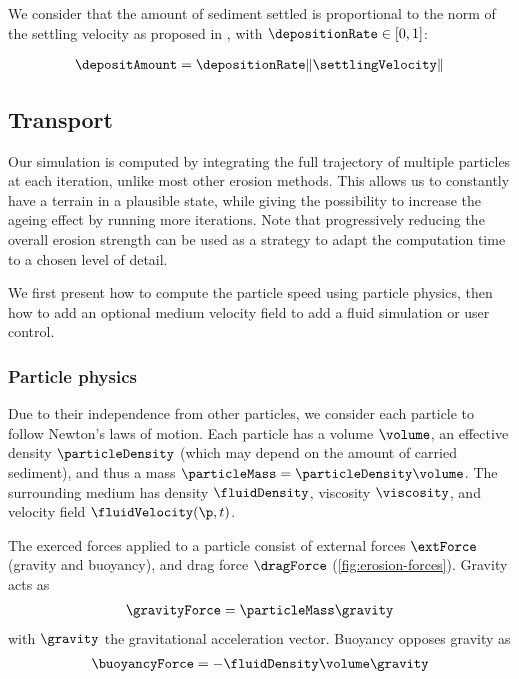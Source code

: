 We consider that the amount of sediment settled is proportional to the norm of the settling velocity as proposed in \cite{Wojtan2007}, with $\depositionRate \in [0,1]$: 

\begin{align}
    \label{eq:erosion-deltaDepositon}
    \depositAmount = \depositionRate \|\settlingVelocity\|
\end{align}

\subsection{Transport}
Our simulation is computed by integrating the full trajectory of multiple particles at each iteration, unlike most other erosion methods. This allows us to constantly have a terrain in a plausible state, while giving the possibility to increase the ageing effect by running more iterations. 
Note that progressively reducing the overall erosion strength can be used as a strategy to adapt the computation time to a chosen level of detail.

We first present how to compute the particle speed using particle physics, then how to add an optional medium velocity field to add a fluid simulation or user control.


\subsubsection{Particle physics}
Due to their independence from other particles, we consider each particle to follow Newton's laws of motion. Each particle has a volume $\volume$, an effective density $\particleDensity$ (which may depend on the amount of carried sediment), and thus a mass $\particleMass = \particleDensity \volume$. The surrounding medium has density $\fluidDensity$, viscosity $\viscosity$, and velocity field $\fluidVelocity(\p,t)$.

The exerced forces applied to a particle consist of external forces $\extForce$ (gravity and buoyancy), and drag force $\dragForce$ (\cref{fig:erosion-forces}). Gravity acts as
\begin{align}
    \gravityForce = \particleMass \gravity
\end{align}
with $\gravity$ the gravitational acceleration vector. Buoyancy opposes gravity as
\begin{align}
    \buoyancyForce = -\fluidDensity \volume \gravity
\end{align}

